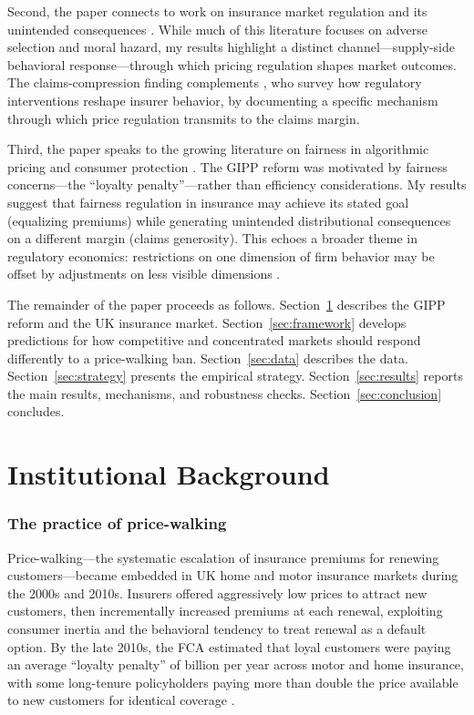 \documentclass[12pt]{article}
\begin{document}
Second, the paper connects to work on insurance market regulation and its unintended consequences \citep{FinkelsteinPoterba2004, EinavFinkelsteinCullen2010, Handel2013}. While much of this literature focuses on adverse selection and moral hazard, my results highlight a distinct channel---supply-side behavioral response---through which pricing regulation shapes market outcomes. The claims-compression finding complements \citet{CumminsWeiss2014}, who survey how regulatory interventions reshape insurer behavior, by documenting a specific mechanism through which price regulation transmits to the claims margin.

Third, the paper speaks to the growing literature on fairness in algorithmic pricing and consumer protection \citep{BrownGoolsbee2002, FCA_EP25_2, ChiapporiSalanie2000}. The GIPP reform was motivated by fairness concerns---the ``loyalty penalty''---rather than efficiency considerations. My results suggest that fairness regulation in insurance may achieve its stated goal (equalizing premiums) while generating unintended distributional consequences on a different margin (claims generosity). This echoes a broader theme in regulatory economics: restrictions on one dimension of firm behavior may be offset by adjustments on less visible dimensions \citep{GlaeserShleifer2001, Posner1974}.

The remainder of the paper proceeds as follows. Section~\ref{sec:background} describes the GIPP reform and the UK insurance market. Section~\ref{sec:framework} develops predictions for how competitive and concentrated markets should respond differently to a price-walking ban. Section~\ref{sec:data} describes the data. Section~\ref{sec:strategy} presents the empirical strategy. Section~\ref{sec:results} reports the main results, mechanisms, and robustness checks. Section~\ref{sec:conclusion} concludes.


\section{Institutional Background}
\label{sec:background}

\subsubsection*{The practice of price-walking} Price-walking---the systematic escalation of insurance premiums for renewing customers---became embedded in UK home and motor insurance markets during the 2000s and 2010s. Insurers offered aggressively low prices to attract new customers, then incrementally increased premiums at each renewal, exploiting consumer inertia and the behavioral tendency to treat renewal as a default option. By the late 2010s, the FCA estimated that loyal customers were paying an average ``loyalty penalty'' of  billion per year across motor and home insurance, with some long-tenure policyholders paying more than double the price available to new customers for identical coverage \citep{FCA_MS18}.
\end{document}
